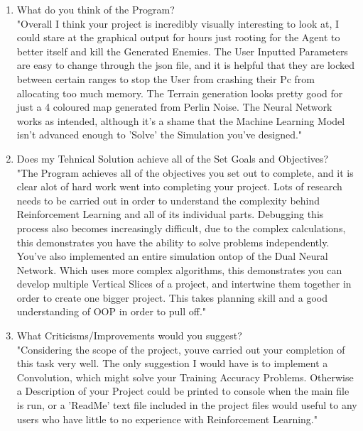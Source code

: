 \begin{flushleft}
        \begin{enumerate}
            \item What do you think of the Program? \\
                \vspace{0.2cm}
                "Overall I think your project is incredibly visually interesting to look at, I could stare at the graphical output for hours
                just rooting for the Agent to better itself and kill the Generated Enemies. The User Inputted Parameters are easy to change
                through the json file, and it is helpful that they are locked between certain ranges to stop the User from crashing their Pc
                from allocating too much memory. The Terrain generation looks pretty good for just a 4 coloured map generated from Perlin Noise.
                The Neural Network works as intended, although it's a shame that the Machine Learning Model isn't advanced enough to 'Solve' the
                Simulation you've designed."

            \item Does my Tehnical Solution achieve all of the Set Goals and Objectives? \\
                \vspace{0.2cm}
                "The Program achieves all of the objectives you set out to complete, and it is clear alot of hard work went into completing your
                project. Lots of research needs to be carried out in order to understand the complexity behind Reinforcement Learning and all
                of its individual parts. Debugging this process also becomes increasingly difficult, due to the complex calculations, this 
                demonstrates you have the ability to solve problems independently. \\
                \vspace{0.2cm}
                You've also implemented an entire simulation ontop of the Dual Neural Network. Which uses more complex algorithms, this demonstrates
                you can develop multiple Vertical Slices of a project, and intertwine them together in order to create one bigger project. This
                takes planning skill and a good understanding of OOP in order to pull off." \\

            \item What Criticisms/Improvements would you suggest? \\
                \vspace{0.2cm}
                "Considering the scope of the project, youve carried out your completion of this task very well. The only suggestion I would have is
                to implement a Convolution, which might solve your Training Accuracy Problems. Otherwise a Description of your Project could be
                printed to console when the main file is run, or a 'ReadMe' text file included in the project files would useful to any users who 
                have little to no experience with Reinforcement Learning." \\


\end{enumerate}
\end{flushleft}
